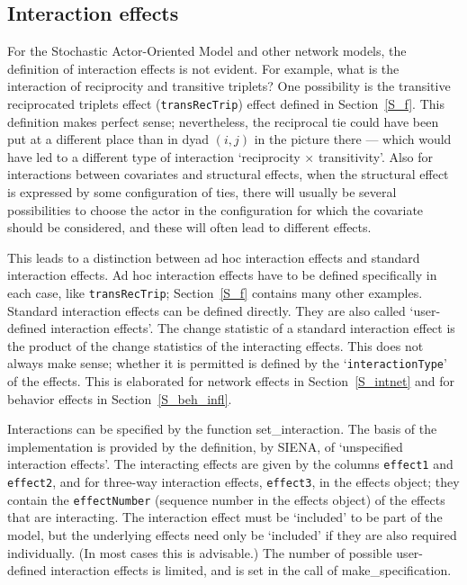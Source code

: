 \documentclass[a4paper,fleqn,11pt]{article}
\newcommand{\+}{\, + \,}
\newcommand{\sfn}[1]{\textsf{#1}}
\newcommand{\si}{{\sf SIENA}}
\newcommand{\SAOM}{{Stochastic Actor-Oriented Model }}
\begin{document}
\hypertarget{T_int_eff}{
\subsection{Interaction effects}
}
\label{S_int_eff}

For the \SAOM and other network models, the definition of interaction
effects is not evident. For example, what is the interaction of
reciprocity and transitive triplets? One possibility is the
transitive reciprocated triplets effect (\texttt{transRecTrip})
effect defined in Section~\ref{S_f}.
This definition makes perfect sense; nevertheless, the reciprocal tie could
have been put at a different place than in dyad $(i,j)$
in the picture there --- which would have led
to a different type of interaction `reciprocity $\times$ transitivity'.
Also for interactions between covariates and structural effects,
when the structural effect is expressed by some configuration of ties,
there will usually be several possibilities to choose the actor in the
configuration for which the covariate should be considered, and these will
often lead to different effects.

This leads to a distinction between ad hoc interaction effects and standard
interaction effects.
Ad hoc interaction effects have to be defined specifically in each case,
like \texttt{transRecTrip}; Section~\ref{S_f} contains many other examples.
Standard interaction effects can be defined directly.
They are also called `user-defined interaction effects'.
The change statistic of a standard interaction effect is the product of the
change statistics of the interacting effects.
This does not always make sense; whether it is permitted
is defined by the `\texttt{interactionType}' of the effects.
This is elaborated for network effects in Section~\ref{S_intnet}
and for behavior effects in Section~\ref{S_beh_infl}.

Interactions can be specified by the function \sfn{set\_interaction}.
The basis of the implementation is provided by the definition,
by \si, of `unspecified interaction effects'.
The interacting effects are given by
the columns \texttt{effect1} and \texttt{effect2},
and for three-way interaction effects, \texttt{effect3},
in the effects object; they contain the \texttt{effectNumber}
(sequence number in the effects object) of the effects that are interacting.
The interaction effect must be `included' to be part of the model,
but the underlying effects need only be `included' if
they are also required individually.
(In most cases this is advisable.)
The number of possible user-defined interaction effects is limited,
and is set in the call of \sfn{make\_specification}.
\medskip
\end{document}

